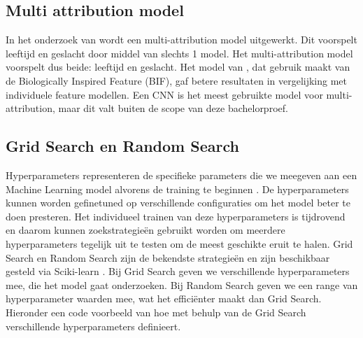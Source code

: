 \subsection{Multi attribution model}\label{sub:mamodel}
In het onderzoek van \autocite{Gupta2022} wordt een multi-attribution model uitgewerkt. Dit voorspelt leeftijd en geslacht door middel van slechts 1 model. Het multi-attribution model voorspelt dus beide: leeftijd en geslacht. Het model van \autocite{Guo2014}, dat gebruik maakt van de Biologically Inspired Feature (BIF), gaf betere resultaten in vergelijking met individuele feature modellen. Een CNN is het meest gebruikte model voor multi-attribution, maar dit valt buiten de scope van deze bachelorproef.

\subsection{Grid Search en Random Search} \label{sub:gridsearch}
Hyperparameters representeren de specifieke parameters die we meegeven aan een Machine Learning model alvorens de training te beginnen \autocite{Ibtisamah2023}. De hyperparameters kunnen worden gefinetuned op verschillende configuraties om het model beter te doen presteren. Het individueel trainen van deze hyperparameters is tijdrovend en daarom kunnen zoekstrategieën gebruikt worden om meerdere hyperparameters tegelijk uit te testen om de meest geschikte eruit te halen. Grid Search en Random Search zijn de bekendste strategieën en zijn beschikbaar gesteld via Sciki-learn \autocite{scikitlearn2024}. Bij Grid Search geven we verschillende hyperparameters mee, die het model gaat onderzoeken. Bij Random Search geven we een range van hyperparameter waarden mee, wat het efficiënter maakt dan Grid Search.
Hieronder een code voorbeeld van hoe \autocite{Educative2024} met behulp van de Grid Search verschillende hyperparameters definieert.
